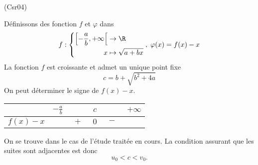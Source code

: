 \begin{tiny}(Csr04)\end{tiny} Définissons des fonction $f$ et $\varphi$ dans  
\[
f:
\left\lbrace 
\begin{aligned}
 \left[ -\frac{a}{b},+\infty \right[ &\rightarrow \R \\ x &\mapsto \sqrt{a + bx}
\end{aligned}
\right. ,\;
\varphi(x) = f(x) - x
\]
La fonction $f$ est croissante et admet un unique point fixe 
\[
 c = b + \sqrt{b^2 + 4a}
\]
On peut déterminer le signe de $f(x) - x$.
\begin{center}
\begin{tabular}{l|ccccc|}
           & $-\frac{a}{b}$ &         & $c$ &         & $+\infty$\\ \hline
$f(x) -x$ &                & $\;+\;$ & $0$ & $\;-\;$ & \\
\end{tabular}
\end{center}
On se trouve dans le cas de l'étude traitée en cours. La condition assurant que les suites sont adjacentes est donc
\[
 u_0 < c < v_0.
\]
